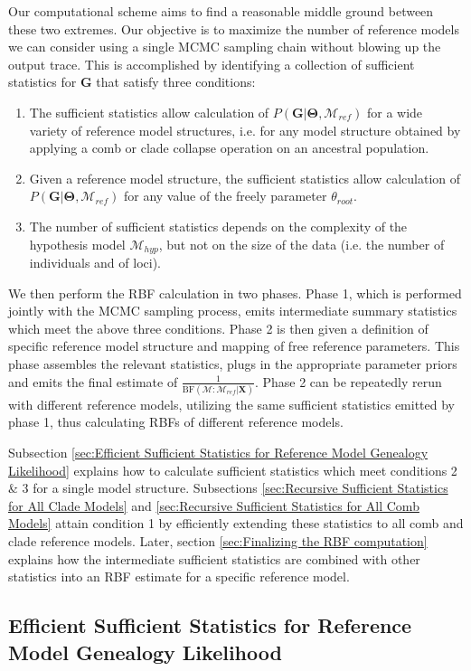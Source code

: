 \documentclass[11pt]{article}
\newcommand{\vect}[1]{\boldsymbol{\mathbf{#1}}}
\newcommand{\X}{\vect{X}}
\newcommand{\M}{\mathcal{M}}
\newcommand{\G}{\vect{G}}
\newcommand{\T}{\vect{\Theta}}
\newcommand{\Mref}{\M_{ref}}
\newcommand{\Mhyp}{\M_{hyp}}
\newcommand{\rbf}{\text{BF}}
\newcommand{\1}{\mathbbm{1}}
\begin{document}
Our computational scheme aims to find a reasonable middle ground between these two extremes.
%
Our objective is to maximize the number of reference models we can consider using a single MCMC sampling chain without blowing up the output trace.
%
This is accomplished by identifying a collection of sufficient statistics for $\G$ that satisfy three conditions:
%
\begin{enumerate}
 \item The sufficient statistics allow calculation of $P(\G|\T,\Mref)$ for a wide variety of reference model structures, i.e. for any model structure obtained by applying a comb or clade collapse operation on an ancestral population.
 \item Given a reference model structure, the sufficient statistics allow calculation of $P(\G|\T,\Mref)$ for any value of the freely parameter $\theta_{root}$.
 \item The number of sufficient statistics depends on the complexity of the hypothesis model $\Mhyp$, but not on the size of the data (i.e. the number of individuals and of loci).
\end{enumerate}
%
We then perform the RBF calculation in two phases. 
%
Phase 1, which is performed jointly with the MCMC sampling process, emits intermediate summary statistics which meet the above three conditions. 
%
Phase 2 is then given a definition of specific reference model structure and mapping of free reference parameters. This phase assembles the relevant statistics, plugs in the appropriate parameter priors and emits the final estimate of $ \frac{1}{\rbf(\M:\Mref|\X)}$. 
%
Phase 2 can be repeatedly rerun with different reference models, utilizing the same sufficient statistics emitted by phase 1, thus calculating RBFs of different reference models.

Subsection \ref{sec:Efficient Sufficient Statistics for Reference Model Genealogy Likelihood} explains how to calculate sufficient statistics which meet conditions 2 \& 3 for a single model structure.
%
Subsections \ref{sec:Recursive Sufficient Statistics for All Clade Models} and \ref{sec:Recursive Sufficient Statistics for All Comb Models} attain condition 1 by efficiently extending these statistics to all comb and clade reference models.
%
Later, section \ref{sec:Finalizing the RBF computation} explains how the intermediate sufficient statistics are combined with other statistics into an RBF estimate for a specific reference model.

\subsection{Efficient Sufficient Statistics for Reference Model Genealogy Likelihood}
\label{sec:Efficient sufficient statistics for reference model genealogy likelihood}
\end{document}

